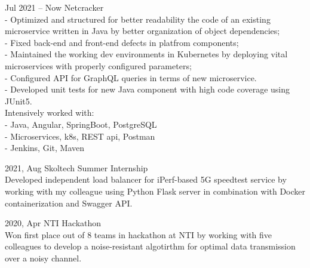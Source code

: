 \documentclass[]{cv-style}          %
\begin{document}
\begin{entrylist}

\entry
    {Jul 2021 -- Now}
    {Netcracker}
    {}
    {\\ 
    - Optimized and structured for better readability the code of an existing microservice written in Java by better organization of object dependencies;\\ - Fixed back-end and front-end defects in platfrom components;\\ - Maintained the working dev environments in Kubernetes by deploying vital microservices with properly configured parameters;\\ - Configured API for GraphQL queries in terms of new microservice.\\ - Developed unit tests for new Java component with high code coverage using JUnit5.\\

Intensively worked with:\\
- Java, Angular, SpringBoot, PostgreSQL\\
- Microservices, k8s, REST api, Postman\\
- Jenkins, Git, Maven}

\entrySkoltech
    {2021, Aug}
    {Skoltech Summer Internship}
    {
    \\
    Developed independent load balancer for iPerf-based 5G speedtest service by working with my colleague using Python Flask server in combination with Docker containerization and Swagger API.
    }

\entry
    {2020, Apr}
    {NTI Hackathon}
    {}
    {\\
Won first place out of 8 teams in hackathon at NTI by working with five colleagues to develop a noise-resistant algotirthm for optimal data transmission over a noisy channel.
    }


\end{entrylist}
\end{document}
